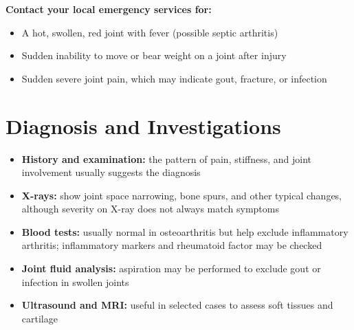 \textbf{Contact your local emergency services for:}
\begin{itemize}
    \item A hot, swollen, red joint with fever (possible septic arthritis)
    \item Sudden inability to move or bear weight on a joint after injury
    \item Sudden severe joint pain, which may indicate gout, fracture, or infection
\end{itemize}

\section*{Diagnosis and Investigations}
\begin{itemize}
    \item \textbf{History and examination:} the pattern of pain, stiffness, and joint involvement usually suggests the diagnosis
    \item \textbf{X-rays:} show joint space narrowing, bone spurs, and other typical changes, although severity on X-ray does not always match symptoms
    \item \textbf{Blood tests:} usually normal in osteoarthritis but help exclude inflammatory arthritis; inflammatory markers and rheumatoid factor may be checked
    \item \textbf{Joint fluid analysis:} aspiration may be performed to exclude gout or infection in swollen joints
    \item \textbf{Ultrasound and MRI:} useful in selected cases to assess soft tissues and cartilage
\end{itemize}

